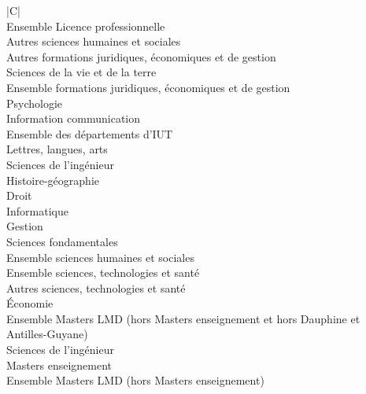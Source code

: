 \documentclass[12pt, a4paper, titlepage, table]{article}
\begin{document}
\begin{table}[H]
	\centering
	\begin{tabularx}{\textwidth}{|C|}
		\hline
		 \\
		\hline
		Ensemble Licence professionnelle \\
		\hline
		Autres sciences humaines et sociales \\
		\hline
		Autres formations juridiques, économiques et de gestion \\
		\hline
		Sciences de la vie et de la terre \\
		\hline
		Ensemble formations juridiques, économiques et de gestion \\
		\hline
		Psychologie \\
		\hline
		Information communication \\
		\hline
		Ensemble des départements d'IUT \\
		\hline
		Lettres, langues, arts \\
		\hline
		Sciences de l'ingénieur \\
		\hline
		Histoire-géographie \\
		\hline
		Droit \\
		\hline
		Informatique \\
		\hline
		Gestion \\
		\hline
		Sciences fondamentales \\
		\hline
		Ensemble sciences humaines et sociales \\
		\hline
		Ensemble sciences, technologies et santé \\
		\hline
		Autres sciences, technologies et santé \\
		\hline
		Économie \\
		\hline
		Ensemble Masters LMD (hors Masters enseignement et hors Dauphine et Antilles-Guyane) \\
		\hline
		Sciences de l'ingénieur \\
		\hline
		Masters enseignement \\
		\hline
		Ensemble Masters LMD (hors Masters enseignement) \\
		\hline
	\end{tabularx}
	\caption{Variable catégorielle concernant les disciplines pour les 3 niveaux de diplôme et leurs modalités}
	\label{tab:disciplines}
\end{table}
\end{document}
